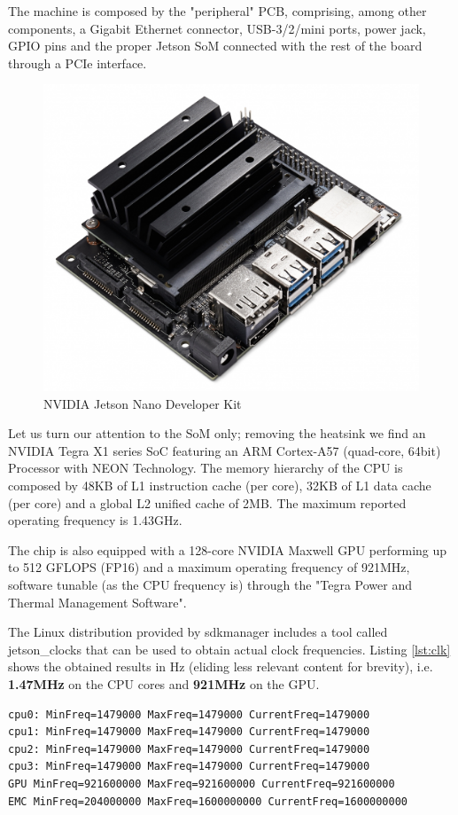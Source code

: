 \documentclass{article}
\begin{document}
The machine is composed by the "peripheral" PCB, comprising, among other components, a Gigabit Ethernet connector, USB-3/2/mini ports, power jack, GPIO pins and the proper Jetson SoM connected with the rest of the board through a PCIe interface.
\begin{figure}[h]
    \centering
    \includegraphics[width=.5\textwidth]{assets/JetsonNano-DevKit_Front-Top_Right_trimmed.jpg}
    \caption{NVIDIA Jetson Nano Developer Kit}
    \label{fig:jetsonnano}
\end{figure}
Let us turn our attention to the SoM only; removing the heatsink we find an NVIDIA Tegra X1 series SoC featuring an ARM Cortex-A57 (quad-core, 64bit) Processor with NEON Technology. The memory hierarchy of the CPU is composed by 48KB of L1 instruction cache (per core), 32KB of L1 data cache (per core) and a global L2 unified cache of 2MB. The maximum reported operating frequency is 1.43GHz.

The chip is also equipped with a 128-core NVIDIA Maxwell GPU performing up to 512 GFLOPS (FP16) and a maximum operating frequency of 921MHz, software tunable (as the CPU frequency is) through the "Tegra Power and Thermal Management Software".

The Linux distribution provided by sdkmanager includes a tool called jetson\_clocks that can be used to obtain actual clock frequencies. Listing \ref{lst:clk} shows the obtained results in Hz (eliding less relevant content for brevity), i.e. \textbf{1.47MHz} on the CPU cores and \textbf{921MHz} on the GPU.

\begin{lstlisting}
cpu0: MinFreq=1479000 MaxFreq=1479000 CurrentFreq=1479000
cpu1: MinFreq=1479000 MaxFreq=1479000 CurrentFreq=1479000
cpu2: MinFreq=1479000 MaxFreq=1479000 CurrentFreq=1479000
cpu3: MinFreq=1479000 MaxFreq=1479000 CurrentFreq=1479000
GPU MinFreq=921600000 MaxFreq=921600000 CurrentFreq=921600000
EMC MinFreq=204000000 MaxFreq=1600000000 CurrentFreq=1600000000
\end{lstlisting}\label{lst:clk}
\end{document}
